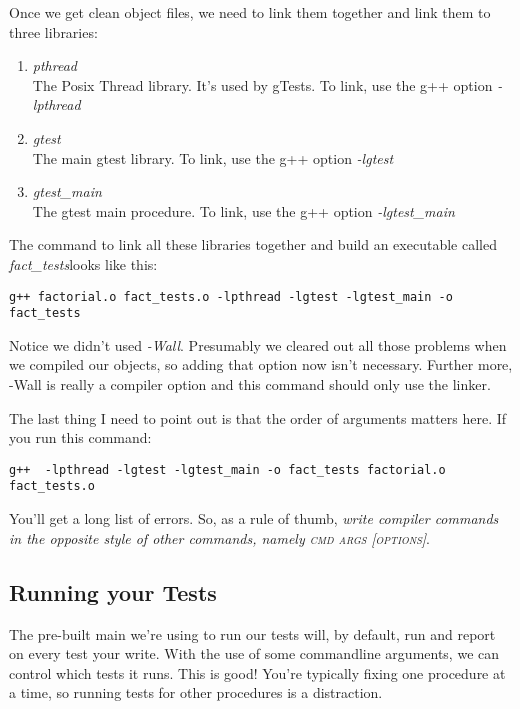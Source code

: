 \documentclass[]{tufte-handout}
\begin{document}
Once we get clean object files, we need to link them together and link them to three libraries:
\begin{enumerate}
\item \textit{pthread} \\ The Posix Thread library. It's used by gTests. To link, use the g++ option \textit{-lpthread}
\item \textit{gtest} \\ The main gtest library. To link, use the g++ option \textit{-lgtest}
\item \textit{gtest\_main} \\ The gtest main procedure. To link, use the g++ option \textit{-lgtest\_main}
\end{enumerate}
The command to link all these libraries together and build an executable called \textit{fact\_tests}looks like this:
\begin{verbatim}
g++ factorial.o fact_tests.o -lpthread -lgtest -lgtest_main -o fact_tests
\end{verbatim}
Notice we didn't used \textit{-Wall}.  Presumably we cleared out all those problems when we compiled our objects, so adding that option now isn't necessary. Further more, -Wall is really a compiler option and this command should only use the linker. 

The last thing I need to point out is that the order of arguments matters here.  If you run this command:
\begin{verbatim}
g++  -lpthread -lgtest -lgtest_main -o fact_tests factorial.o fact_tests.o
\end{verbatim}
You'll get a long list of errors. So, as a rule of thumb, \textit{write compiler commands in the opposite style of other commands, namely \textsc{cmd args [options]}}.

\subsection{Running your Tests}

The pre-built main we're using to run our tests will, by default, run and report on every test your write. With the use of some commandline arguments, we can control which tests it runs.  This is good! You're typically fixing one procedure at a time, so running tests for other procedures is a distraction. 
\end{document}
